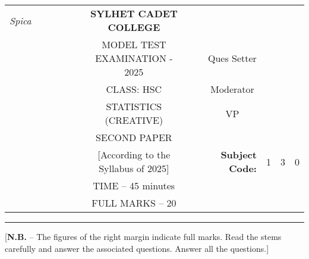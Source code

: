 \documentclass[12pt]{article}
\begin{document}
\begin{table}[]
\begin{tabular}{llllllcllrlll}
\textit{Spica} &  &  &  &  &  & \textbf{SYLHET CADET COLLEGE}       &  &                       & \multicolumn{1}{l}{}                        &                        &                        &                        \\ \cline{10-13} 
                 &  &  &  &  &  & MODEL TEST EXAMINATION - 2025             &  & \multicolumn{1}{l|}{} & \multicolumn{1}{c|}{Ques Setter}            & \multicolumn{3}{l|}{}                                                    \\ \cline{10-13} 
                 &  &  &  &  &  & CLASS: HSC                          &  & \multicolumn{1}{l|}{} & \multicolumn{1}{c|}{Moderator}              & \multicolumn{3}{l|}{}                                                    \\ \cline{10-13} 
                 &  &  &  &  &  & STATISTICS (CREATIVE)               &  & \multicolumn{1}{l|}{} & \multicolumn{1}{c|}{VP}                     & \multicolumn{3}{l|}{}                                                    \\ \cline{10-13} 
                 &  &  &  &  &  & SECOND PAPER                        &  &                       &                                             &                        &                        &                        \\ \cline{11-13} 
                 &  &  &  &  &  & [According to the Syllabus of 2025] &  &                       & \multicolumn{1}{r|}{\textbf{Subject Code:}} & \multicolumn{1}{l|}{1} & \multicolumn{1}{l|}{3} & \multicolumn{1}{l|}{0} \\ \cline{11-13} 
                 &  &  &  &  &  & TIME –  45 minutes        &  &                       &                                             &                        &                        &                        \\
                 &  &  &  &  &  & FULL MARKS – 20                     &  &                       & \textbf{}                                   &                        &                        &                       
\end{tabular}
\end{table}

\hrule

\begin{center}
[\textbf{N.B.} – The figures of the right margin indicate full marks. Read the stems carefully and answer the associated questions. Answer all the questions.]\\
\end{center}
\end{document}

